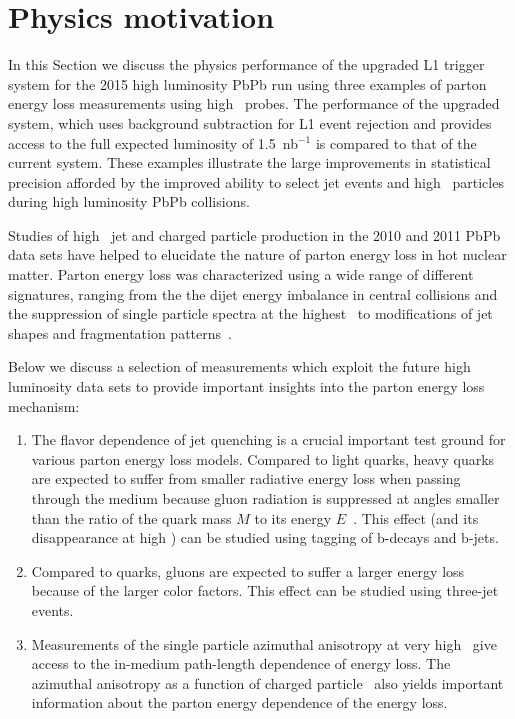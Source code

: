 \section{Physics motivation\label{sec:physHI}}
\label{sec:physics}

In this Section we discuss the physics performance of the upgraded L1 trigger system for the 2015 high luminosity PbPb run
using three examples of parton energy loss measurements using high \pt\ probes. 
The performance of the upgraded system, which uses background subtraction for L1 event rejection and provides 
access to the full expected luminosity of 1.5~nb$^{-1}$ is compared to that of the current system. 
These examples illustrate the large improvements in statistical precision afforded by the  improved 
ability to select jet events and high \pt\ particles during high luminosity PbPb collisions. 


Studies of high \pt\ jet and charged particle production in the 2010 and 2011 PbPb data sets have helped to elucidate the nature of parton energy loss in hot nuclear matter. Parton energy loss was characterized using a wide range 
of different signatures, ranging from the the dijet energy imbalance in central collisions and the suppression of single particle
spectra at the highest \pt\ to modifications of jet shapes and fragmentation patterns~\cite{Chatrchyan:2011sx,Aamodt:2010jd,Alice:dihadron,CMS:2012aa,Chatrchyan:2012nia,Aad:2010bu,atlas:2012is,Chatrchyan:2012gt,Chatrchyan:2012gw}. 

Below we discuss a selection of measurements which exploit the future high luminosity data sets to 
provide important insights into the parton energy loss mechanism:

\begin{enumerate}
\item The flavor dependence of jet quenching is a crucial important test ground for various parton energy loss models. 
Compared to light quarks, heavy quarks are expected to suffer from smaller radiative energy loss when passing 
through the medium because gluon radiation is suppressed at angles smaller than the ratio of the quark mass $M$ to 
its energy $E$~\cite{Dokshitzer:2001zm}. This effect (and its disappearance at high \pt) can be studied using tagging
of b-decays and b-jets.
\item Compared to quarks, gluons are expected to suffer a larger 
energy loss because of the larger color factors. This effect can be studied using three-jet events.
\item Measurements of the single particle azimuthal anisotropy at very high \pt\ give access to the in-medium path-length 
dependence of energy loss. The azimuthal anisotropy as a function of charged particle \pt\ also yields 
important information about the parton energy dependence of the energy loss.
\end{enumerate}

